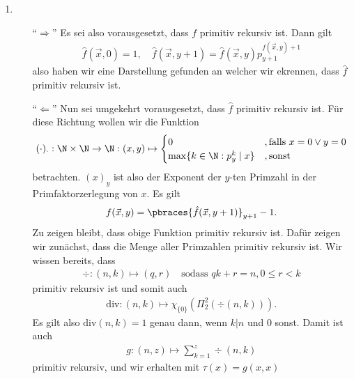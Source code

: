 \begin{solution}

\phantom{}
\begin{enumerate}[label = (\alph*)]
	\item
		\begin{enumerate}
			\item[``$\Rightarrow$''] Es sei also vorausgesetzt, dass $f$ primitiv rekursiv ist. Dann gilt
				\begin{align*}
				\hat{f}(\vec{x},0) = 1, \quad \hat{f}(\vec{x}, y + 1) = \hat{f}(\vec{x},y)p_{y+1}^{f(\vec{x}, y) + 1}
				\end{align*}
				also haben wir eine Darstellung gefunden an welcher wir ekrennen, dass $\hat{f}$ primitiv rekursiv ist.
			\item[``$\Leftarrow$''] Nun sei umgekehrt vorausgesetzt, dass $\hat{f}$ primitiv rekursiv ist. Für diese Richtung wollen wir die Funktion
				\begin{align*}
				(\cdot)_\cdot : \N \times \N \to \N : (x,y) \mapsto
				\begin{cases}
				0 &, \text{falls } x = 0 \lor y = 0 \\
				\max\{k \in \N : p_y^k \mid x \} &, \text{sonst}
				\end{cases}
				\end{align*}
				betrachten. $(x)_y$ ist also der Exponent der $y$-ten Primzahl in der Primfaktorzerlegung von $x$. Es gilt
				\begin{align*}
				f(\vec{x},y) = \pbraces{\hat{f}(\vec{x}, y + 1)}_{y + 1} - 1.
				\end{align*}
				Zu zeigen bleibt, dass obige Funktion primitiv rekursiv ist.
				Dafür zeigen wir zunächst, dass die Menge aller Primzahlen primitiv rekursiv
				ist. Wir wissen bereits, dass
				\begin{align*}
					\div: (n,k) \mapsto (q,r) \quad \text{sodass } qk + r = n, 0 \leq r < k
				\end{align*}
				primitiv rekursiv ist und somit auch
				\begin{align*}
					\mathrm{div}: (n,k) \mapsto \chi_{\{0\}}(\Pi_2^2(\div(n,k))).
				\end{align*}
				Es gilt also $\mathrm{div}(n,k) = 1$ genau dann, wenn $k | n$ und $0$ sonst.
				Damit ist auch
				\begin{align*}
					g: (n,z) \mapsto \sum_{k=1}^z \div(n,k)
				\end{align*}
				primitiv rekursiv, und wir erhalten mit $\tau(x) = g(x,x)$
				\begin{align*}

\end{align*}
\end{enumerate}
\end{enumerate}
\end{solution}
